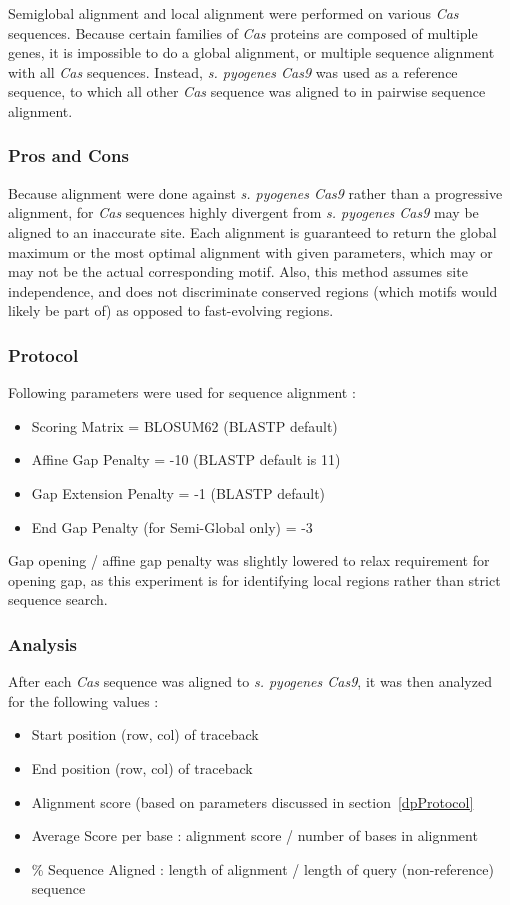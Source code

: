 \documentclass[11pt, oneside]{article}
\begin{document}
Semiglobal alignment and local alignment were performed on various \textit{Cas} sequences. Because certain families of \textit{Cas} proteins are composed of multiple genes, it is impossible to do a global alignment, or multiple sequence alignment with all \textit{Cas} sequences. Instead, \textit{s. pyogenes Cas9} was used as a reference sequence, to which all other \textit{Cas} sequence was aligned to in pairwise sequence alignment. 


\subsubsection{Pros and Cons}

Because alignment were done against \textit{s. pyogenes Cas9} rather than a progressive alignment, for \textit{Cas} sequences highly divergent from \textit{s. pyogenes Cas9} may be aligned to an inaccurate site. Each alignment is guaranteed to return the global maximum or the most optimal alignment with given parameters, which may or may not be the actual corresponding motif. Also, this method assumes site independence, and does not discriminate conserved regions (which motifs would likely be part of) as opposed to fast-evolving regions.


\subsubsection{Protocol} 
Following parameters were used for sequence alignment :
\begin{itemize}
\item Scoring Matrix = BLOSUM62 (BLASTP default)
\item Affine Gap Penalty = -10 (BLASTP default is 11)
\item Gap Extension Penalty = -1 (BLASTP default)
\item End Gap Penalty (for Semi-Global only) = -3
\end{itemize}

Gap opening / affine gap penalty was slightly lowered to relax requirement for opening gap, as this experiment is for identifying local regions rather than strict sequence search.


\subsubsection{Analysis}

After each \textit{Cas} sequence was aligned to \textit{s. pyogenes Cas9}, it was then analyzed for the following values :
\begin{itemize}
\item Start position (row, col) of traceback
\item End position (row, col) of traceback
\item Alignment score (based on parameters discussed in section~\ref{dpProtocol}
\item Average Score per base : alignment score / number of bases in alignment
\item \% Sequence Aligned : length of alignment / length of query (non-reference) sequence
\end{itemize}
\end{document}
